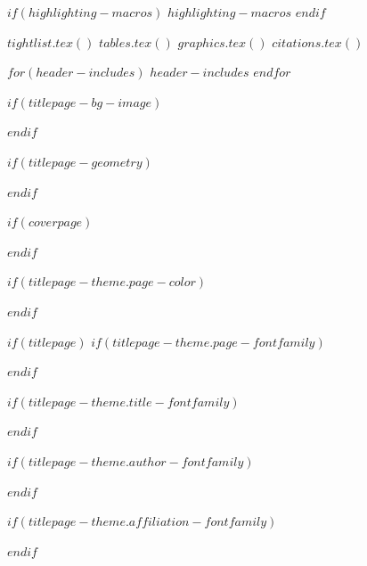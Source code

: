 $if(highlighting-macros)$
$highlighting-macros$
$endif$

$tightlist.tex()$
$tables.tex()$
$graphics.tex()$
$citations.tex()$

$for(header-includes)$
$header-includes$
$endfor$

\providecommand{\templefooterlogo}{%
  \noindent\begin{minipage}[b]{0.72\linewidth}\footerblock\end{minipage}%
  \hfill\begin{minipage}[b]{0.24\linewidth}\raggedleft\logoblock\end{minipage}}

\usepackage{hyphenat}
\usepackage{ifthen}
\usepackage{calc}
\usepackage{calculator}

$if(titlepage-bg-image)$
\usepackage{graphicx}
\usepackage{wallpaper}
$endif$

$if(titlepage-geometry)$
\usepackage{geometry}
$endif$

$if(coverpage)$
\usepackage{graphicx}
\usepackage{geometry}
\usepackage{afterpage}
\usepackage{tikz}
\usetikzlibrary{calc}
\usetikzlibrary{fadings}
\usepackage[pagecolor=none]{pagecolor}
$endif$

$if(titlepage-theme.page-color)$
\usepackage[pagecolor=none]{pagecolor}
$endif$

$if(titlepage)$
$if(titlepage-theme.page-fontfamily)$
\usepackage{fontspec}
$endif$

$if(titlepage-theme.title-fontfamily)$
\usepackage{fontspec}
$endif$

$if(titlepage-theme.author-fontfamily)$
\usepackage{fontspec}
$endif$

$if(titlepage-theme.affiliation-fontfamily)$
\usepackage{fontspec}
$endif$

